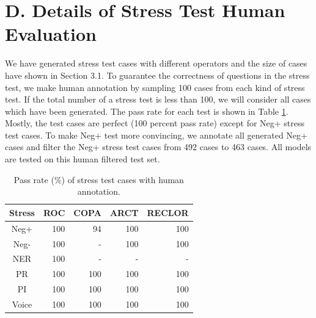 \documentclass[letterpaper]{article} %
\newcommand{\tabref}[1]{Table \ref{#1}}
\begin{document}
\section{D.   Details of Stress Test Human Evaluation} 
We have generated stress test cases with different operators and 
the size of cases have shown in Section 3.1. 
To guarantee the correctness of questions in the stress test, we make 
human annotation by sampling 100 cases from each kind of stress test. 
If the total number of a stress test is less than 100, we will consider all  
cases which have been generated. 
The pass rate for each test is shown in \tabref{tab:pass_rate}. 
Mostly, the test cases are perfect (100 percent pass rate) except for Neg+ stress test cases. 
To make Neg+ test more convincing, we annotate all generated 
Neg+ cases and filter the Neg+ stress test cases from 492 cases to 463 cases. 
All models are tested on this human filtered test set. 
\begin{table}[th]
\centering
\scriptsize
\begin{tabular}{c|rrrr}
\toprule
\textbf{Stress} & \textbf{ROC} & \textbf{COPA} & \textbf{ARCT} & \textbf{RECLOR} \\ \midrule
Neg+  & 100&94&  100&100 \\ \hline
Neg-  & 100& -&  100&    100\\ \hline
NER  &  100&    -&  -&- \\ \hline
PR  &   100&100&100&100   \\ \hline
PI  &        100&   100&    100& 100\\  \hline
Voice  &    100&100   &100    &100    \\  \bottomrule
\end{tabular}
\caption{Pass rate (\%) of stress test cases with human annotation.}
\label{tab:pass_rate}
\end{table}
\end{document}
